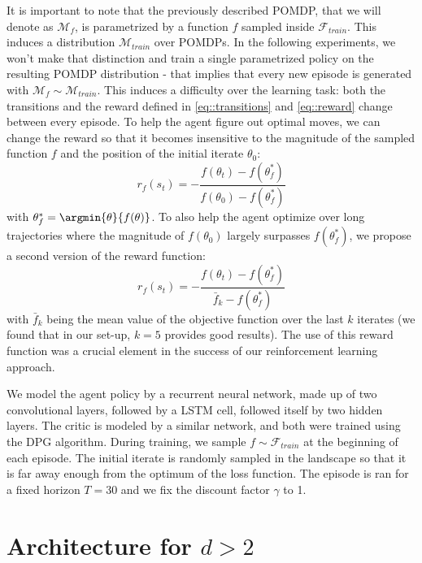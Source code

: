		It is important to note that the previously described POMDP, that we will denote as $\mathcal{M}_f$, is parametrized by a function $f$ sampled inside $\mathcal{F}_{train}$. This induces a distribution $\mathcal{M}_{train}$ over POMDPs. In the following experiments, we won't make that distinction and train a single parametrized policy on the resulting POMDP distribution - that implies that every new episode is generated with $\mathcal{M}_f \sim \mathcal{M}_{train}$. This induces a difficulty over the learning task: both the transitions and the reward defined in \eqref{eq::transitions} and \eqref{eq::reward} change between every episode. To help the agent figure out optimal moves, we can change the reward so that it becomes insensitive to the magnitude of the sampled function $f$ and the position of the initial iterate $\theta_0$:
			\begin{equation}
				r_f(s_t) = -\frac{f(\theta_t) - f(\theta_f^*)}{f(\theta_0)-f(\theta_f^*)}
			\end{equation}
			with $\theta_f^* = \argmin{\theta}{f(\theta)}$. To also help the agent optimize over long trajectories where the magnitude of $f(\theta_0)$ largely surpasses $f(\theta_f^*)$, we propose a second version of the reward function:
			\begin{equation}
				r_f(s_t) = -\frac{f(\theta_t) - f(\theta_f^*)}{\bar{f}_k-f(\theta_f^*)}
			\end{equation}
			with $\bar{f}_k$ being the mean value of the objective function over the last $k$ iterates (we found that in our set-up, $k=5$ provides good results). The use of this reward function was a crucial element in the success of our reinforcement learning approach.
			
	We model the agent policy by a recurrent neural network, made up of two convolutional layers, followed by a LSTM cell, followed itself by two hidden layers. The critic is modeled by a similar network, and both were trained using the DPG algorithm. During training, we sample $f\sim\mathcal{F}_{train}$ at the beginning of each episode. The initial iterate is randomly sampled in the landscape so that it is far away enough from the optimum of the loss function. The episode is ran for a fixed horizon $T=30$ and we fix the discount factor $\gamma$ to 1. 
	
\section{Architecture for $d>2$}
\label{sec::highd}

